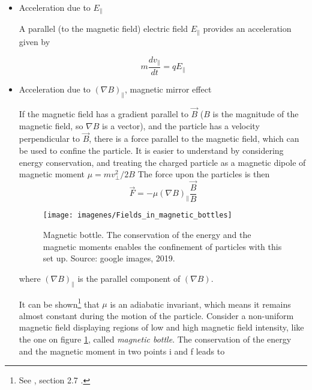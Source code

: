 \documentclass[a4paper,12pt,oneside]{book}
\begin{document}
\begin{itemize}

\item Acceleration due to $E_{\parallel}$

A parallel (to the magnetic field) electric field $E_{\parallel}$ provides an acceleration given by

\begin{equation}
m \dfrac{d v_{\parallel}}{dt}=q E_{\parallel}
\end{equation}


\item Acceleration due to $(\nabla B)_{\parallel}$, magnetic mirror effect

If the magnetic field has a gradient parallel to $\vec{B}$ ($B$ is the magnitude of the magnetic field, so $\nabla B$ is a vector), and the particle has a velocity perpendicular to $\vec{B}$, there is a force parallel to the magnetic field, which can be used to confine the particle. It is easier to understand by considering energy conservation, and treating the charged particle as a magnetic dipole of magnetic moment $\mu=m v_{\perp}^2/2 B$ The force upon the particles is then
%
\begin{equation}
\vec{F}=-\mu (\nabla B)_{\parallel} \dfrac{\vec{B}}{B}
\end{equation}
%
\begin{figure}[htbp]
\centering
\texttt{[image: imagenes/Fields\_in\_magnetic\_bottles]}
\caption{Magnetic bottle. The conservation of the energy and the magnetic moments enables the confinement of particles with this set up. Source: google images, 2019.}
\label{fig mag bottle}
\end{figure}
where $(\nabla B)_{\parallel}$ is the parallel component of $(\nabla B)$.
%

It can be shown\footnote{See \cite{Wesson}, section 2.7 .} that $\mu$ is an adiabatic invariant, which means it remains almost constant during the motion of the particle. Consider a non-uniform magnetic field displaying regions of low and high magnetic field intensity, like the one on figure \ref{fig mag bottle}, called \textit{magnetic bottle}. The conservation of the energy and the magnetic moment in two points i and f leads to


\end{itemize}
\end{document}
